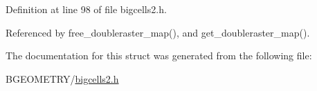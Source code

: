 Definition at line 98 of file bigcells2.\-h.



Referenced by free\-\_\-doubleraster\-\_\-map(), and get\-\_\-doubleraster\-\_\-map().



The documentation for this struct was generated from the following file\-:\begin{DoxyCompactItemize}
\item 
B\-G\-E\-O\-M\-E\-T\-R\-Y/\hyperlink{bigcells2_8h}{bigcells2.\-h}\end{DoxyCompactItemize}
